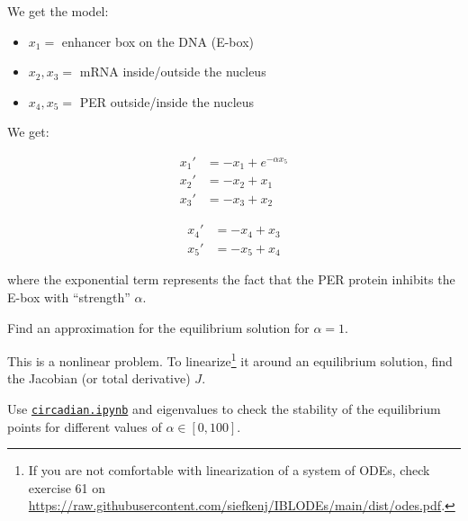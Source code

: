 \documentclass{workbook}
\begin{document}
\begin{slide}
\begin{problem}
\begin{slidesonly}
	\vspace{2cm}
\end{slidesonly}

We get the model:
\begin{itemize}
	\item $x_1 = $ enhancer box on the DNA (E-box)
	\item $x_2, x_3 = $ mRNA inside/outside the nucleus
	\item $x_4, x_5 = $ PER outside/inside the nucleus
\end{itemize}
We get:

\hfil \begin{minipage}{.4\textwidth}
\begin{align*}
	x_1' & = -x_1 + e^{-\alpha x_5} \\
	x_2' & = -x_2 + x_1 \\
	x_3' & = -x_3+ x_2 
\end{align*}	
\end{minipage}
\quad 
\begin{minipage}{.4\textwidth}
\begin{align*}
	x_4' & = -x_4 + x_3 \\
	x_5' & = -x_5+ x_4 
\end{align*}	
\end{minipage}

where the exponential term represents the fact that the PER protein inhibits the E-box with ``strength'' $\alpha$.
\end{problem}

\begin{parts}
	\item Find an approximation for the equilibrium solution for $\alpha = 1$.
	\item This is a nonlinear problem. To linearize\footnote{If you are not comfortable with linearization of a system of ODEs, check exercise 61 on \url{https://raw.githubusercontent.com/siefkenj/IBLODEs/main/dist/odes.pdf}.} it around an equilibrium solution, find the Jacobian (or total derivative) $J$.
	\item Use \href{https://utoronto.syzygy.ca/jupyter/user-redirect/git-pull?repo=https://github.com/bigfatbernie/IBLMathModeling&subPath=python/circadian.ipynb}{\tt circadian.ipynb} and eigenvalues to check the stability of the equilibrium points for different values of $\alpha \in [0,100]$.
\end{parts}

%



\end{slide}
\end{document}
